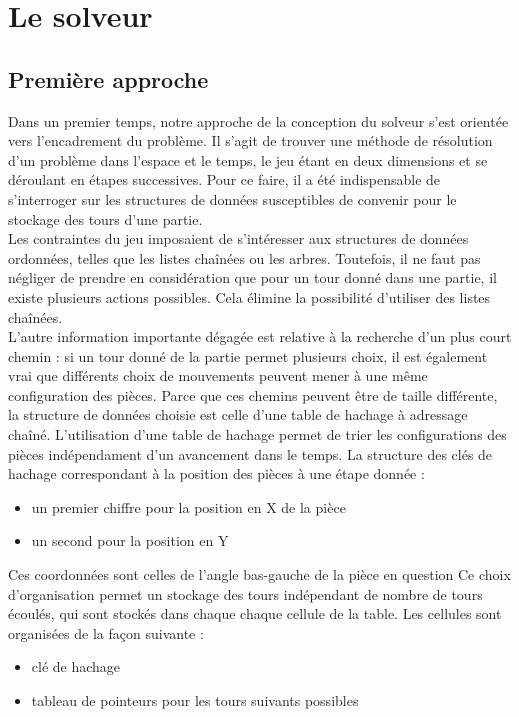 \documentclass{report}
\begin{document}
\chapter{Le solveur}
\setcounter{section}{0}
\section{Première approche}
Dans un premier temps, notre approche de la conception du solveur s'est orientée vers l'encadrement du problème.
Il s'agit de trouver une méthode de résolution d'un problème dans l'espace et le temps, le jeu étant en deux dimensions et se déroulant en étapes successives.
Pour ce faire, il a été indispensable de s'interroger sur les structures de données susceptibles de convenir pour le stockage des tours d'une partie.\\
Les contraintes du jeu imposaient de s'intéresser aux structures de données ordonnées, telles que les listes chaînées ou les arbres.
Toutefois, il ne faut pas négliger de prendre en considération que pour un tour donné dans une partie, il existe plusieurs actions possibles.
Cela élimine la possibilité d'utiliser des listes chaînées.\\
L'autre information importante dégagée est relative à la recherche d'un plus court chemin : si un tour donné de la partie permet plusieurs choix, il est également vrai que différents choix de mouvements peuvent mener à une même configuration des pièces.
Parce que ces chemins peuvent être de taille différente, la structure de données choisie est celle d'une table de hachage à adressage chaîné.
L'utilisation d'une table de hachage permet de trier les configurations des pièces indépendament d'un avancement dans le temps.
La structure des clés de hachage correspondant à la position des pièces à une étape donnée :
\begin{itemize}
\item un premier chiffre pour la position en X de la pièce 
\item un second pour la position en Y 
\end{itemize}
Ces coordonnées sont celles de l'angle bas-gauche de la pièce en question
Ce choix d'organisation permet un stockage des tours indépendant de nombre de tours écoulés, qui sont stockés dans chaque chaque cellule de la table.
Les cellules sont organisées de la façon suivante :
\begin{itemize}
\item clé de hachage
\item tableau de pointeurs pour les tours suivants possibles
\end{itemize}
\end{document}

